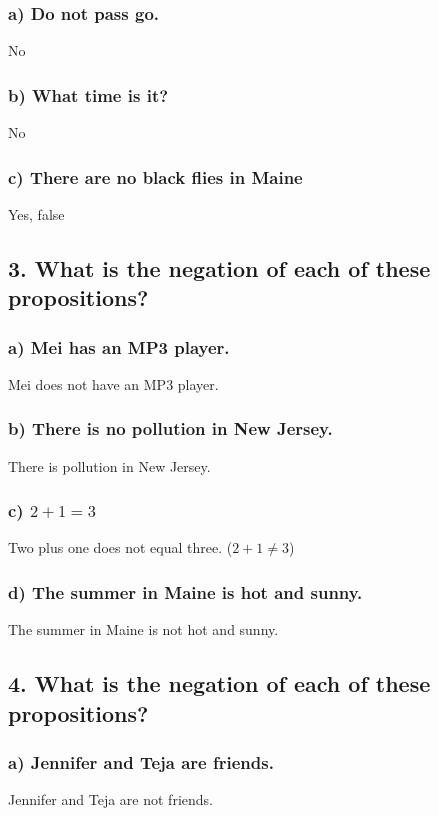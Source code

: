 \documentclass[11pt, oneside]{article} %
\numberwithin{equation}{section} %
\numberwithin{figure}{section} %
\numberwithin{table}{section} %
\begin{document}
\subsubsection{a) Do not pass go.}
No
\subsubsection{b) What time is it?}
No
\subsubsection{c) There are no black flies in Maine}
Yes, false

\subsection{3. What is the negation of each of these propositions?}
\subsubsection{a) Mei has an MP3 player.}
Mei does not have an MP3 player.
\subsubsection{b) There is no pollution in New Jersey.}
There is pollution in New Jersey.
\subsubsection{c) $2 + 1 = 3$}
Two plus one does not equal three. ($2 + 1 \neq 3$)
\subsubsection{d) The summer in Maine is hot and sunny.}
The summer in Maine is not hot and sunny.

\subsection{4. What is the negation of each of these propositions?}
\subsubsection{a) Jennifer and Teja are friends.}
Jennifer and Teja are not friends.
\end{document}
